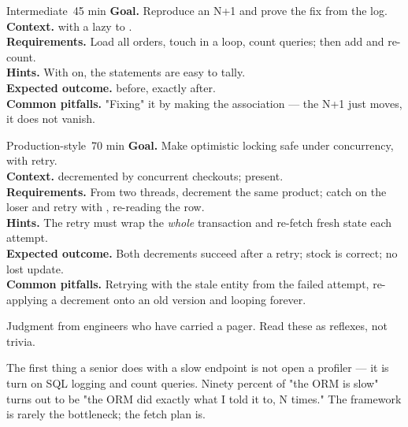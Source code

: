 \begin{minilab}{Intermediate}{~45 min}
\textbf{Goal.} Reproduce an N+1 and prove the fix from the log.\\
\textbf{Context.}  with a lazy  to .\\
\textbf{Requirements.} Load all orders, touch  in a loop, count queries; then add  and re-count.\\
\textbf{Hints.} With  on, the statements are easy to tally.\\
\textbf{Expected outcome.}  before, exactly  after.\\
\textbf{Common pitfalls.} "Fixing" it by making the association  --- the N+1 just moves, it does not vanish.
\end{minilab}

\begin{minilab}{Production-style}{~70 min}
\textbf{Goal.} Make optimistic locking safe under concurrency, with retry.\\
\textbf{Context.}  decremented by concurrent checkouts;  present.\\
\textbf{Requirements.} From two threads, decrement the same product; catch  on the loser and retry with , re-reading the row.\\
\textbf{Hints.} The retry must wrap the \emph{whole} transaction and re-fetch fresh state each attempt.\\
\textbf{Expected outcome.} Both decrements succeed after a retry; stock is correct; no lost update.\\
\textbf{Common pitfalls.} Retrying with the stale entity from the failed attempt, re-applying a decrement onto an old version and looping forever.
\end{minilab}


Judgment from engineers who have carried a pager. Read these as reflexes, not trivia.

\begin{seniornote}
The first thing a senior does with a slow endpoint is not open a profiler --- it is turn on SQL logging and count queries. Ninety percent of "the ORM is slow" turns out to be "the ORM did exactly what I told it to, N times." The framework is rarely the bottleneck; the fetch plan is.
\end{seniornote}

